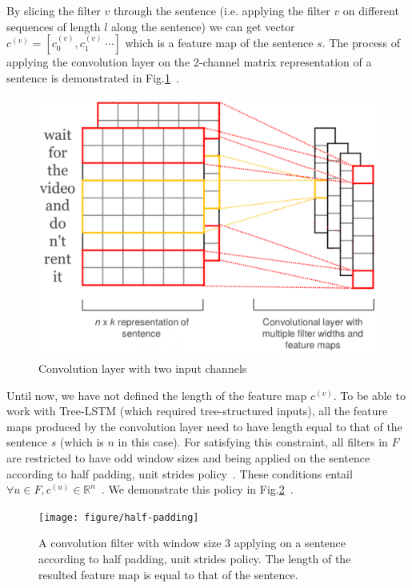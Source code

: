 By slicing the filter \(v\) through the sentence (i.e. applying the filter \(v\) on different sequences of length \(l\) along the sentence) we can get vector \(c^{(v)} = [c^{(v)}_0, c^{(v)}_1~\cdots]\) which is a feature map of the sentence \(s\).
The process of applying the convolution layer on the 2-channel matrix representation of a sentence is demonstrated in Fig.\ref{fig:cnn-module}~\cite{KimCNN}.

\begin{figure}[H]
    \centering
    \includegraphics[scale=0.3]{figure/cnn-module}
    \caption[Convolution layer with two input channels]{Convolution layer with two input channels}
    \label{fig:cnn-module}
\end{figure}

Until now, we have not defined the length of the feature map \(c^{(v)}\).
To be able to work with Tree-LSTM (which required tree-structured inputs), all the feature maps produced by the convolution layer need to have length equal to that of the sentence \(s\) (which is \(n\) in this case).
For satisfying this constraint, all filters in \(F\) are restricted to have odd window sizes and being applied on the sentence according to half padding, unit strides policy~\cite{conv-arith}.
These conditions entail \({\forall u \in F,  c^{(u)} \in \mathbb{R}^n}\)~\cite{conv-arith}.
We demonstrate this policy in Fig.\ref{fig:half-padding}~\cite{cnn-rnn}.

\begin{figure}[H]
    \centering
\texttt{[image: figure/half-padding]}
    \caption[Half padding, unit strides policy]{A convolution filter with window size 3 applying on a sentence according to half padding, unit strides policy.
    The length of the resulted feature map is equal to that of the sentence.}
    \label{fig:half-padding}
\end{figure}

